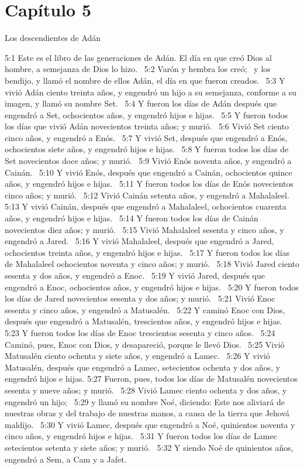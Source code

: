 \section*{Capítulo 5}
Los descendientes de Adán  


5:1 Este es el libro de las generaciones de Adán. El día en que creó Dios al hombre, a semejanza de Dios lo hizo.  
5:2 Varón y hembra los creó;  y los bendijo, y llamó el nombre de ellos Adán, el día en que fueron creados.  
5:3 Y vivió Adán ciento treinta años, y engendró un hijo a su semejanza, conforme a su imagen, y llamó su nombre Set.  
5:4 Y fueron los días de Adán después que engendró a Set, ochocientos años, y engendró hijos e hijas.  
5:5 Y fueron todos los días que vivió Adán novecientos treinta años; y murió.  
5:6 Vivió Set ciento cinco años, y engendró a Enós.  
5:7 Y vivió Set, después que engendró a Enós, ochocientos siete años, y engendró hijos e hijas.  
5:8 Y fueron todos los días de Set novecientos doce años; y murió.  
5:9 Vivió Enós noventa años, y engendró a Cainán.  
5:10 Y vivió Enós, después que engendró a Cainán, ochocientos quince años, y engendró hijos e hijas.  
5:11 Y fueron todos los días de Enós novecientos cinco años; y murió.  
5:12 Vivió Cainán setenta años, y engendró a Mahalaleel.  
5:13 Y vivió Cainán, después que engendró a Mahalaleel, ochocientos cuarenta años, y engendró hijos e hijas.  
5:14 Y fueron todos los días de Cainán novecientos diez años; y murió.  
5:15 Vivió Mahalaleel sesenta y cinco años, y engendró a Jared.  
5:16 Y vivió Mahalaleel, después que engendró a Jared, ochocientos treinta años, y engendró hijos e hijas.  
5:17 Y fueron todos los días de Mahalaleel ochocientos noventa y cinco años; y murió.  
5:18 Vivió Jared ciento sesenta y dos años, y engendró a Enoc.  
5:19 Y vivió Jared, después que engendró a Enoc, ochocientos años, y engendró hijos e hijas.  
5:20 Y fueron todos los días de Jared novecientos sesenta y dos años; y murió.  
5:21 Vivió Enoc sesenta y cinco años, y engendró a Matusalén.  
5:22 Y caminó Enoc con Dios, después que engendró a Matusalén, trescientos años, y engendró hijos e hijas.  
5:23 Y fueron todos los días de Enoc trescientos sesenta y cinco años.  
5:24 Caminó, pues, Enoc con Dios, y desapareció, porque le llevó Dios.  
5:25 Vivió Matusalén ciento ochenta y siete años, y engendró a Lamec.  
5:26 Y vivió Matusalén, después que engendró a Lamec, setecientos ochenta y dos años, y engendró hijos e hijas. 
5:27 Fueron, pues, todos los días de Matusalén novecientos sesenta y nueve años; y murió.  
5:28 Vivió Lamec ciento ochenta y dos años, y engendró un hijo;  
5:29 y llamó su nombre Noé, diciendo: Este nos aliviará de nuestras obras y del trabajo de nuestras manos, a causa de la tierra que Jehová maldijo.  
5:30 Y vivió Lamec, después que engendró a Noé, quinientos noventa y cinco años, y engendró hijos e hijas.  
5:31 Y fueron todos los días de Lamec setecientos setenta y siete años; y murió.  
5:32 Y siendo Noé de quinientos años, engendró a Sem, a Cam y a Jafet.  
